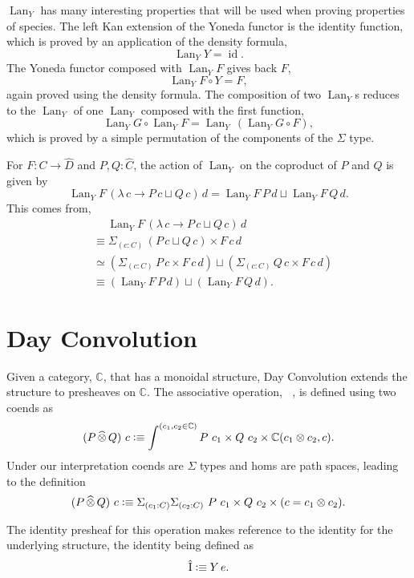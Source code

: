 \documentclass[12pt, parskip, DIV=14]{scrbook}
\newcommand{\defeq}{\vcentcolon\equiv}
\renewcommand{\circ}{\vysmwhtcircle}
\DeclareMathOperator\daytensor{\widehat\otimes}
\newcommand{\dayid}{\operatorname{\hat{I}}}
\newcommand{\Lan}{\operatorname{Lan}}
\newcommand{\id}{\operatorname{id}}
\begin{document}
$\Lan_Y$ has many interesting properties that will be used when proving properties of species. The left Kan extension of the Yoneda functor is the identity function, which is proved by an application of the density formula,
$$\Lan_Y Y = \id.$$ The Yoneda functor composed with $\Lan_Y F$ gives back $F$,
$$\Lan_Y F \circ Y = F,$$ again proved using the density formula. The composition of two $\Lan_Y$s reduces to the $\Lan_Y$ of one $\Lan_Y$ composed with the first function,
$$\Lan_Y G \circ \Lan_Y F = \Lan_Y\,(\Lan_Y G \circ F),$$
which is proved by a simple permutation of the components of the $\Sigma$ type.

For $F : C \to \widehat{D}$ and $P , Q : \widehat{C}$, the action of $\Lan_Y$ on the coproduct of $P$ and $Q$ is given by
$$\Lan_Y F\,(\lambda\,c \to P\,c \sqcup Q\,c)\,d = \Lan_Y F\,P\,d \sqcup \Lan_Y F\,Q\,d.$$
This comes from,
\begin{align*}
&\quad\ \Lan_Y F\,(\lambda\,c \to P\,c \sqcup Q\,c)\,d \\
&\equiv \Sigma_{(c : C)}\,(P\,c \sqcup Q\,c) \times F\,c\,d \\
&\simeq (\Sigma_{(c : C)}\,P\,c \times F\,c\,d) \sqcup (\Sigma_{(c : C)}\,Q\,c \times F\,c\,d) \\
&\equiv (\Lan_Y F\,P\,d) \sqcup (\Lan_Y F\,Q\,d).
\end{align*}

\section{Day Convolution}
\label{sec:dayconv}

Given a category, $\mathbb{C}$, that has a monoidal structure, Day Convolution extends the structure to presheaves on $\mathbb{C}$. The associative operation, $\daytensor$, is defined using two coends as
$$(P \daytensor Q)~c \defeq \int^{(c_1 , c_2 \in \mathbb{C})} P~c_1 \times Q~c_2 \times \mathbb{C}(c_1 \otimes c_2 , c).$$
Under our interpretation coends are $\Sigma$ types and homs are path spaces, leading to the definition
$$(P \daytensor Q)~c \defeq \Sigma_{(c_1 : C)}\Sigma_{(c_2 : C)}~P~c_1 \times Q~c_2 \times (c = c_1 \otimes c_2).$$

The identity presheaf for this operation makes reference to the identity for the underlying structure, the identity being defined as $$\dayid \defeq Y\,e.$$
\end{document}
